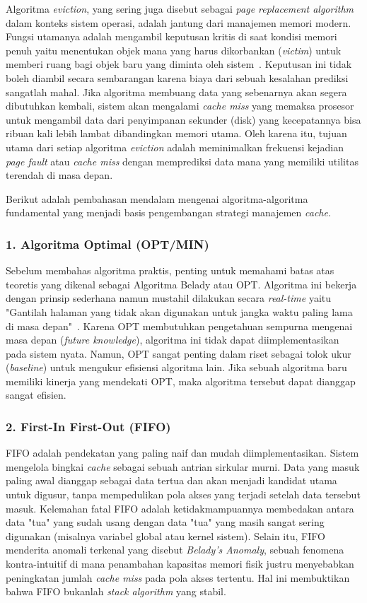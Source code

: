 Algoritma \textit{eviction}, yang sering juga disebut sebagai
\textit{page replacement algorithm}
dalam konteks sistem operasi, adalah jantung dari manajemen memori modern.
Fungsi utamanya adalah mengambil keputusan kritis di saat kondisi memori penuh
yaitu menentukan objek mana yang harus dikorbankan (\textit{victim}) untuk
memberi ruang
bagi objek baru yang diminta oleh sistem~\cite{Belady1966A}.
Keputusan ini tidak boleh diambil secara sembarangan karena biaya
dari sebuah kesalahan
prediksi sangatlah mahal. Jika algoritma membuang data yang
sebenarnya akan segera
dibutuhkan kembali, sistem akan mengalami \textit{cache miss} yang
memaksa prosesor
untuk mengambil data dari penyimpanan sekunder (disk) yang
kecepatannya bisa ribuan
kali lebih lambat dibandingkan memori utama. Oleh karena itu, tujuan utama dari
setiap algoritma \textit{eviction} adalah meminimalkan frekuensi
kejadian \textit{page fault}
atau \textit{cache miss} dengan memprediksi data mana yang memiliki
utilitas terendah
di masa depan.

Berikut adalah pembahasan mendalam mengenai algoritma-algoritma fundamental
yang menjadi basis pengembangan strategi manajemen \textit{cache}.

\subsubsection{1. Algoritma Optimal (OPT/MIN)}
Sebelum membahas algoritma praktis, penting untuk memahami batas atas teoretis
yang dikenal sebagai Algoritma Belady atau OPT. Algoritma ini bekerja
dengan prinsip
sederhana namun mustahil dilakukan secara \textit{real-time} yaitu
"Gantilah halaman
yang tidak akan digunakan untuk jangka waktu paling lama di masa
depan"~\cite{Belady1966A}.
Karena OPT membutuhkan pengetahuan sempurna mengenai masa depan
(\textit{future knowledge}),
algoritma ini tidak dapat diimplementasikan pada sistem nyata. Namun, OPT sangat
penting dalam riset sebagai tolok ukur (\textit{baseline}) untuk
mengukur efisiensi
algoritma lain. Jika sebuah algoritma baru memiliki kinerja yang mendekati OPT,
maka algoritma tersebut dapat dianggap sangat efisien.

\subsubsection{2. First-In First-Out (FIFO)}
FIFO adalah pendekatan yang paling naif dan mudah diimplementasikan.
Sistem mengelola bingkai \textit{cache} sebagai sebuah antrian sirkular murni.
Data yang masuk paling awal dianggap sebagai data tertua dan akan
menjadi kandidat
utama untuk digusur, tanpa mempedulikan pola akses yang terjadi
setelah data tersebut masuk.
Kelemahan fatal FIFO adalah ketidakmampuannya membedakan antara data
"tua" yang sudah usang
dengan data "tua" yang masih sangat sering digunakan (misalnya
variabel global atau kernel sistem).
Selain itu, FIFO menderita anomali terkenal yang disebut
\textit{Belady's Anomaly},
sebuah fenomena kontra-intuitif di mana penambahan kapasitas memori fisik justru
menyebabkan peningkatan jumlah \textit{cache miss} pada pola akses tertentu.
Hal ini membuktikan bahwa FIFO bukanlah \textit{stack algorithm} yang stabil.

